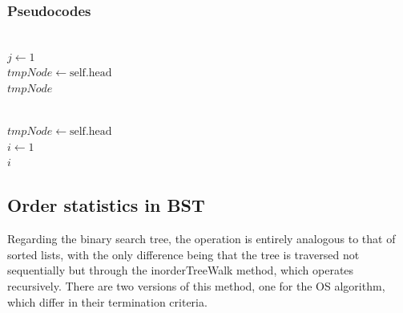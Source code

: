 \documentclass[11pt]{article}
\begin{document}
\subsubsection{Pseudocodes}
\begin{algorithm}[H] 
\SetAlgoLined
{}
\vspace{0.5em}
 \\
\vspace{0.5em}
$j \leftarrow 1$\\
$tmpNode \leftarrow \text{self.head}$\\
\Return $tmpNode$
\end{algorithm}
\vspace{1em}
\begin{algorithm}[H] 
\SetAlgoLined
{}
\vspace{0.5em}
 \\
\vspace{0.5em}
$tmpNode \leftarrow \text{self.head}$\\
$i \leftarrow 1$\\
\Return $i$
\end{algorithm}


\vspace{0.0em}
\subsection{Order statistics in BST}
Regarding the binary search tree, the operation is entirely analogous to that of sorted lists, with the only difference being that the tree is traversed not sequentially but through the inorderTreeWalk method, which operates recursively. There are two versions of this method, one for the OS algorithm, which differ in their termination criteria.
\end{document}
